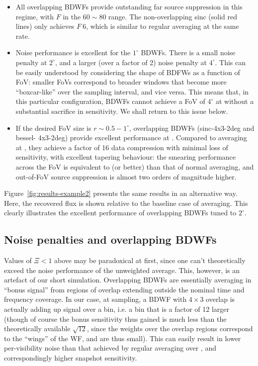 \documentclass[useAMS,usenatbib]{mn2e}
\begin{document}
\begin{itemize}

\item All overlapping BDWFs provide outstanding far source suppression in this regime, with $F$ in the $60\sim80$ range. 
The non-overlapping sinc (solid red lines) only achieves $F~6$, which is similar to regular averaging
at the same rate. 

\item Noise performance is excellent for the $1^\circ$ BDWFs. There is a small noise penalty at $2^\circ$, and a larger 
(over a factor of 2) noise penalty at $4^\circ$. This can be easily understood by considering the shape of BDFWs as
a function of FoV: smaller FoVs correspond to broader windows that become more ``boxcar-like'' over the sampling
interval, and vice versa. This means that, in this particular configuration, BDWFs cannot achieve a FoV of $4^\circ$
at  without a substantial sacrifice in sensitivity. We shall return to this issue below.

\item If the desired FoV size is $r\sim0.5-1^\circ$, overlapping BDWFs (sinc-4x3-2deg and bessel-
4x3-2deg) provide excellent performance at . Compared to averaging at , they achieve a factor
of 16 data compression with minimal loss of sensitivity, with excellent tapering behaviour: the smearing performance 
across the FoV is equivalent to (or better) than that of normal averaging, and out-of-FoV source suppression is almost
two orders of magnitude higher.

\end{itemize}

Figure~\ref{fig:results-example2} presents the same results in an alternative way. Here, the recovered flux is shown 
relative to the baseline case of  averaging. This clearly illustrates the excellent performance of overlapping
BDWFs tuned to $2^\circ$.

\subsection{Noise penalties and overlapping BDWFs}

Values of $\Xi<1$ above may be paradoxical at first, since one can't theoretically exceed the noise performance of the
unweighted average. This, however, is an artefact of our short simulation. Overlapping BDWFs are essentially
averaging in ``bonus signal'' from regions of overlap extending outside the nominal time and frequency 
coverage. In our case, at  sampling, a BDWF with $4\times3$ overlap is actually adding up signal over a
 bin, i.e. a bin that is a factor of 12 larger (though of course the bonus sensitivity thus gained is much
less than the theoretically available $\sqrt{12}$, since the weights over the overlap regions correspond
to the ``wings'' of the WF, and are thus small). This can easily result in lower per-visibility noise than that 
achieved by regular averaging over , and correspondingly higher snapshot sensitivity.
\end{document}
